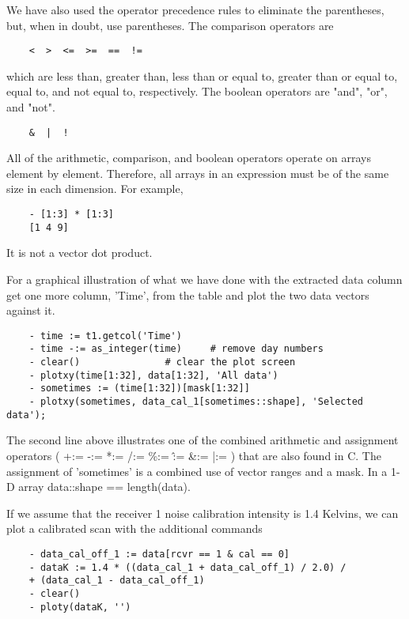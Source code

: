 We have also used the operator precedence rules to eliminate the
parentheses, but, when in doubt, use parentheses. The comparison operators
are

\begin{verbatim}
	<  >  <=  >=  ==  !=
\end{verbatim}

which are less than, greater than, less than or equal to, greater than or
equal to, equal to, and not equal to, respectively.  The boolean operators
are "and", "or", and "not".

\begin{verbatim}
	&  |  !
\end{verbatim}

All of the arithmetic, comparison, and boolean operators operate on arrays
element by element.  Therefore, all arrays in an expression must be of the
same size in each dimension.  For example,

\begin{verbatim}
	- [1:3] * [1:3]
	[1 4 9]
\end{verbatim}

It is not a vector dot product.

    For a graphical illustration of what we have done with the extracted
data column get one more column, 'Time', from the table and plot the two
data vectors against it.

\begin{verbatim}
	- time := t1.getcol('Time')
	- time -:= as_integer(time)		# remove day numbers
	- clear()				# clear the plot screen
	- plotxy(time[1:32], data[1:32], 'All data')
	- sometimes := (time[1:32])[mask[1:32]]
	- plotxy(sometimes, data_cal_1[sometimes::shape], 'Selected data');
\end{verbatim}

The second line above illustrates one of the combined arithmetic and
assignment operators ( +:= -:= *:= /:= \%:= \^:= \&:= |:= ) that are also
found in C.  The assignment of 'sometimes' is a combined use of vector
ranges and a mask.  In a 1-D array data::shape == length(data).

    If we assume that the receiver 1 noise calibration intensity is 1.4
Kelvins, we can plot a calibrated scan with the additional commands

\begin{verbatim}
	- data_cal_off_1 := data[rcvr == 1 & cal == 0]
	- dataK := 1.4 * ((data_cal_1 + data_cal_off_1) / 2.0) /
	+ (data_cal_1 - data_cal_off_1)
	- clear()
	- ploty(dataK, '')
\end{verbatim}

